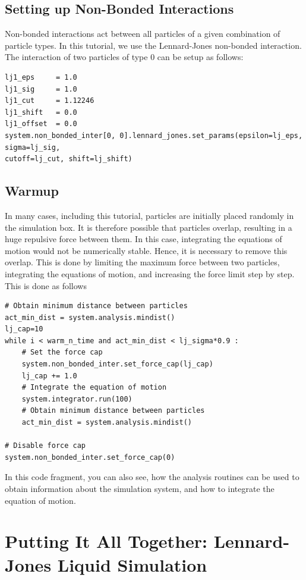 \documentclass[
paper=a4,                       %
fontsize=11pt,                  %
twoside,                        %
footsepline,                    %
headsepline,                    %
headinclude=false,              %
footinclude=false,              %
pagesize,                       %
]{scrartcl}
\begin{document}
\subsection{Setting up Non-Bonded Interactions}

Non-bonded interactions act between all particles of a given combination of particle types.
In this tutorial, we use the Lennard-Jones non-bonded interaction.
The interaction of two particles of type 0 can be setup as follows:
{\small\vspace{0,2cm}
\begin{lstlisting}
lj1_eps     = 1.0
lj1_sig     = 1.0
lj1_cut     = 1.12246
lj1_shift   = 0.0
lj1_offset  = 0.0
system.non_bonded_inter[0, 0].lennard_jones.set_params(epsilon=lj_eps, sigma=lj_sig,
cutoff=lj_cut, shift=lj_shift)
\end{lstlisting}
}\vspace{0,2cm}


\subsection{Warmup}

In many cases, including this tutorial, particles are initially placed randomly in the simulation box. It is therefore possible that particles overlap, resulting in a huge repulsive force between them. In this case, integrating the equations of motion would not be numerically stable. Hence, it is necessary to remove this overlap.
This is done by limiting the maximum force between two particles, integrating the equations of motion, and increasing the force limit step by step.
This is done as follows
\begin{lstlisting}
# Obtain minimum distance between particles
act_min_dist = system.analysis.mindist()
lj_cap=10
while i < warm_n_time and act_min_dist < lj_sigma*0.9 :
    # Set the force cap
    system.non_bonded_inter.set_force_cap(lj_cap)
    lj_cap += 1.0
    # Integrate the equation of motion
    system.integrator.run(100)
    # Obtain minimum distance between particles
    act_min_dist = system.analysis.mindist()

# Disable force cap
system.non_bonded_inter.set_force_cap(0)
\end{lstlisting}
In this code fragment, you can also see, how the analysis routines can be used to obtain information about the simulation system, and how to integrate the equation of motion.


\section{Putting It All Together: Lennard-Jones Liquid Simulation}
\end{document}
